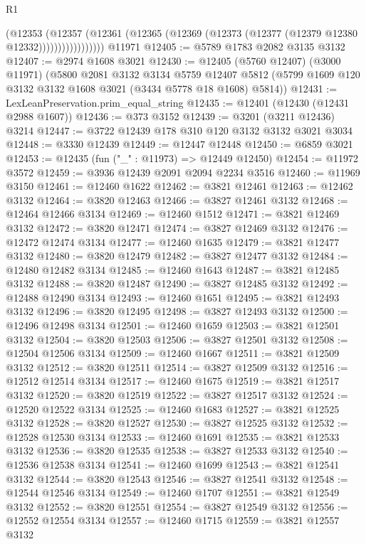 \begin{lexlean}{R1}
\begin{coremodule}
                      (@12353
                        (@12357
                          (@12361
                            (@12365 (@12369 (@12373 (@12377 (@12379 @12380 @12332)))))))))))))))))
    @11971
@12405 := @5789 @1783 @2082 @3135 @3132
@12407 := @2974 @1608 @3021
@12430 := @12405
    (@5760 @12407)
    (@3000 @11971)
    (@5800
      @2081
      @3132
      @3134
      @5759
      @12407
      @5812
      (@5799 @1609 @120 @3132 @3132 @1608 @3021 (@3434 @5778 @18 @1608) @5814))
@12431 := LexLeanPreservation.prim_equal_string
@12435 := @12401 (@12430 (@12431 @2988 @1607))
@12436 := @373 @3152
@12439 := @3201 (@3211 @12436) @3214
@12447 := @3722 @12439 @178 @310 @120 @3132 @3132 @3021 @3034
@12448 := @3330 @12439
@12449 := @12447 @12448
@12450 := @6859 @3021
@12453 := @12435 (fun ("_" : @11973) => @12449 @12450)
@12454 := @11972 @3572
@12459 := @3936 @12439 @2091 @2094 @2234 @3516
@12460 := @11969 @3150
@12461 := @12460 @1622
@12462 := @3821 @12461
@12463 := @12462 @3132
@12464 := @3820 @12463
@12466 := @3827 @12461 @3132
@12468 := @12464 @12466 @3134
@12469 := @12460 @1512
@12471 := @3821 @12469 @3132
@12472 := @3820 @12471
@12474 := @3827 @12469 @3132
@12476 := @12472 @12474 @3134
@12477 := @12460 @1635
@12479 := @3821 @12477 @3132
@12480 := @3820 @12479
@12482 := @3827 @12477 @3132
@12484 := @12480 @12482 @3134
@12485 := @12460 @1643
@12487 := @3821 @12485 @3132
@12488 := @3820 @12487
@12490 := @3827 @12485 @3132
@12492 := @12488 @12490 @3134
@12493 := @12460 @1651
@12495 := @3821 @12493 @3132
@12496 := @3820 @12495
@12498 := @3827 @12493 @3132
@12500 := @12496 @12498 @3134
@12501 := @12460 @1659
@12503 := @3821 @12501 @3132
@12504 := @3820 @12503
@12506 := @3827 @12501 @3132
@12508 := @12504 @12506 @3134
@12509 := @12460 @1667
@12511 := @3821 @12509 @3132
@12512 := @3820 @12511
@12514 := @3827 @12509 @3132
@12516 := @12512 @12514 @3134
@12517 := @12460 @1675
@12519 := @3821 @12517 @3132
@12520 := @3820 @12519
@12522 := @3827 @12517 @3132
@12524 := @12520 @12522 @3134
@12525 := @12460 @1683
@12527 := @3821 @12525 @3132
@12528 := @3820 @12527
@12530 := @3827 @12525 @3132
@12532 := @12528 @12530 @3134
@12533 := @12460 @1691
@12535 := @3821 @12533 @3132
@12536 := @3820 @12535
@12538 := @3827 @12533 @3132
@12540 := @12536 @12538 @3134
@12541 := @12460 @1699
@12543 := @3821 @12541 @3132
@12544 := @3820 @12543
@12546 := @3827 @12541 @3132
@12548 := @12544 @12546 @3134
@12549 := @12460 @1707
@12551 := @3821 @12549 @3132
@12552 := @3820 @12551
@12554 := @3827 @12549 @3132
@12556 := @12552 @12554 @3134
@12557 := @12460 @1715
@12559 := @3821 @12557 @3132

\end{coremodule}
\end{lexlean}
